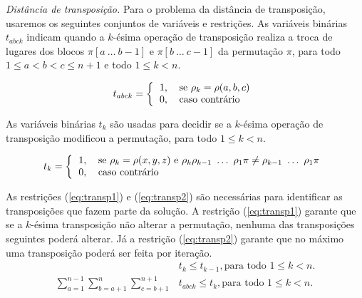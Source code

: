 \textit{Distância de transposição.}
Para o problema da distância de transposição, usaremos os seguintes
conjuntos de variáveis e restrições. As variáveis binárias $t_{abck}$
indicam quando a $k$-ésima operação de transposição realiza a troca de
lugares dos blocos $\pi[a~\ldots~b - 1]$ e $\pi[b~\ldots~c - 1]$ da
permutação $\pi$, para todo $1 \le a < b < c \le n + 1$ e todo $ 1 \le
k < n$.

\[ 
  t_{abck} = \left \{ 
  \begin{tabular}{ll} 
  1, & se $\rho_{k} = \rho(a,b,c)$ \\ 
  0, & caso contrário 
  \end{tabular} \right .
\] 

As variáveis binárias $t_{k}$ são usadas para decidir se a $k$-ésima
operação de transposição modificou a permutação, para todo $ 1 \le k <
n$.

\[ 
  t_{k} = \left \{ 
  \begin{tabular}{ll} 
  1, & se $\rho_{k} = \rho(x,y,z)$ e
  $\rho_{k} \rho_{k-1}~\ldots~\rho_{1} \pi \neq \rho_{k-1}~\ldots~\rho_{1} \pi$\\
  0, & caso contrário 
  \end{tabular} \right .
\]

As restrições (\ref{eq:transp1}) e (\ref{eq:transp2}) são necessárias
para identificar as transposições que fazem parte da solução. A
restrição (\ref{eq:transp1}) garante que se a $k$-ésima transposição
não alterar a permutação, nenhuma das transposições seguintes poderá
alterar. Já a restrição (\ref{eq:transp2}) garante que no máximo uma
transposição poderá ser feita por iteração.
\begin{align}
  &t_{k} \le t_{k-1}, \text{para todo $1 \le k <
  n$}. \label{eq:transp1} \\
  \sum_{a=1}^{n-1}\sum_{b=a+1}^{n}\sum_{c=b+1}^{n+1} &t_{abck} \le
  t_{k} , \text{para todo $1 \le k <
  n$}. \label{eq:transp2} 
\end{align}

